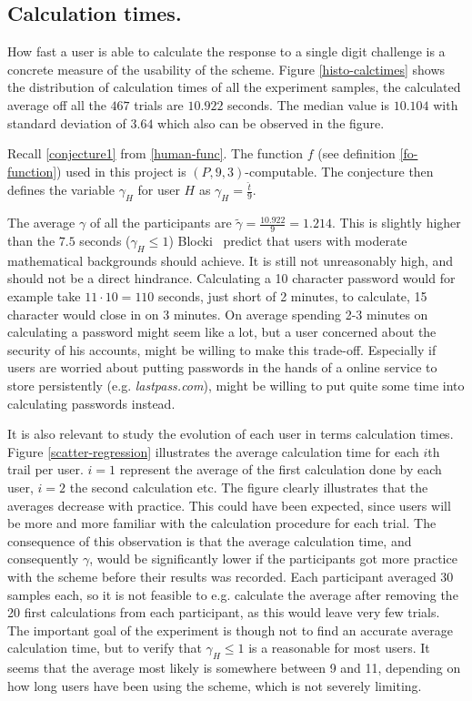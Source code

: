 \subsection{Calculation times.}
How fast a user is able to calculate the response to a single digit challenge is a concrete measure of the usability of the scheme. Figure \ref{histo-calctimes} shows the distribution of calculation times of all the experiment samples, the calculated average off all the $467$ trials are $10.922$ seconds. The median value is $10.104$ with standard deviation of $3.64$ which also can be observed in the figure. 
\par Recall \autoref{conjecture1} from \autoref{human-func}. The function $f$ (see definition \ref{fo-function}) used in this project is $(P,9,3)$-computable. The conjecture then defines the variable $\gamma_H$ for user $H$ as {\Large $\gamma_H = \frac{\hat t}{9}$}. 
\par The average $\gamma$ of all the participants are $\tilde \gamma = \frac{10.922}{9} = 1.214$. This is slightly higher than the $7.5$ seconds ($\gamma_H \le 1 $) Blocki~\cite{hcp-blocki} predict that users with moderate mathematical backgrounds should achieve. It is still not unreasonably high, and should not be a direct hindrance. Calculating a 10 character password would for example take $11 \cdot 10 = 110$ seconds, just short of 2 minutes, to calculate, 15 character would close in on 3 minutes. On average spending 2-3 minutes on calculating a password might seem like a lot, but a user concerned about the security of his accounts, might be willing to make this trade-off. Especially if users are worried about putting passwords in the hands of a online service to store persistently (e.g. \emph{lastpass.com}), might be willing to put quite some time into calculating passwords instead.
\par It is also relevant to study the evolution of each user in terms calculation times. Figure \ref{scatter-regression} illustrates the average calculation time for each $i$th trail per user. $i=1$ represent the average of the first calculation done by each user, $i=2$ the second calculation etc. The figure clearly illustrates that the averages decrease with practice. This could have been expected, since users will be more and more familiar with the calculation procedure for each trial. The consequence of this observation is that the average calculation time, and consequently $\gamma$, would be significantly lower if the participants got more practice with the scheme before their results was recorded. Each participant averaged $30$ samples each, so it is not feasible to e.g. calculate the average after removing the 20 first calculations from each participant, as this would leave very few trials. The important goal of the experiment is though not to find an accurate average calculation time, but to verify that $\gamma_H \le 1$ is a reasonable for most users. It seems that the average most likely is somewhere between 9 and 11, depending on how long users have been using the scheme, which is not severely limiting.

